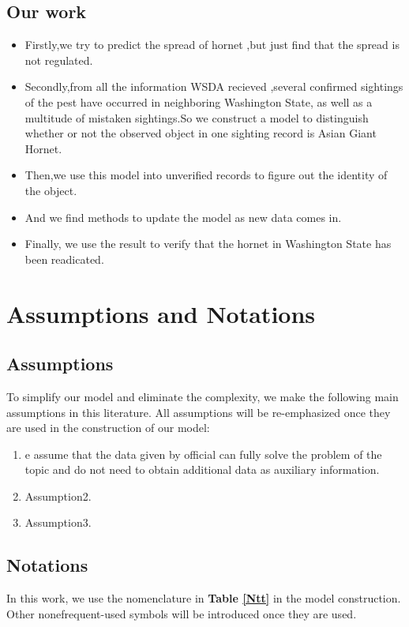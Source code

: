 \documentclass[12pt]{article}
\begin{document}
\subsection{Our work}
\begin{itemize}
	\item Firstly,we try to predict the spread of hornet ,but just find that the spread is not regulated.
	\item Secondly,from all the information WSDA recieved ,several confirmed sightings of the pest have occurred in neighboring Washington State, as well as a multitude of mistaken sightings.So we construct a model to distinguish whether or not the observed object in one sighting record is Asian Giant Hornet.
	\item Then,we use this model into unverified records to figure out the identity of the object.
	\item And we find methods to update the model as new data comes in.
	\item Finally, we use the result to verify that the hornet in Washington State has been readicated.
\end{itemize}


\section{Assumptions and Notations}

\subsection{Assumptions}
To simplify our model and eliminate the complexity, we make the following main assumptions in this literature. All assumptions will be re-emphasized once they are used in the construction of our model:
\begin{enumerate}[\bfseries 1.]
	\item e assume that the data given by official can fully solve the problem of the topic and do not need to obtain additional data as auxiliary information.
	\item Assumption2.
	\item Assumption3.
\end{enumerate}
\subsection{Notations}
In this work, we use the nomenclature in  \textbf{Table \ref{Ntt}} in the model construction. Other nonefrequent-used symbols will be introduced once they are used.
\end{document}
